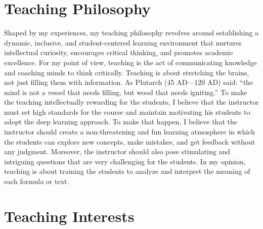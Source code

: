 \documentclass[11pt]{article}
\begin{document}





\section{Teaching Philosophy}
Shaped by my experiences, my teaching philosophy revolves around establishing a dynamic, inclusive, and student-centered learning environment that nurtures intellectual curiosity, encourages critical thinking, and promotes academic excellence.
For my point of view, teaching is the act of communicating knowledge and coaching minds to think critically. Teaching is about stretching the brains, not just filling them with information. As Plutarch (45 AD---120 AD) said: ``the mind is not a vessel that needs filling, but wood that needs igniting.'' To make the teaching intellectually rewarding for the students, I believe that the instructor must set high standards for the course and maintain motivating his students to adopt the deep learning approach. To make that happen, I believe that the instructor should create a non-threatening and fun learning atmosphere in which the students can explore new concepts, make mistakes, and get feedback without any judgment. Moreover, the instructor should also pose stimulating and intriguing questions that are very challenging for the students. In my opinion, teaching is about training the students to analyze and interpret the meaning of each formula or text. 


\section{Teaching Interests}
\end{document}
